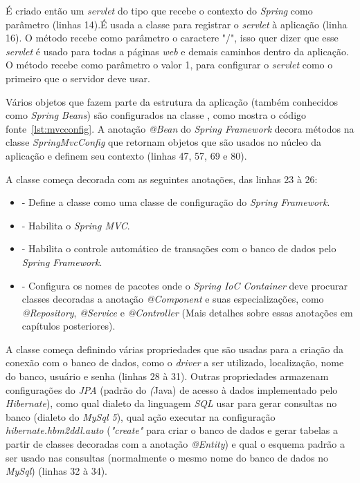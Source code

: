 É criado então um \textit{servlet} do tipo  que recebe o contexto do \textit{Spring} como parâmetro (linhas 14).É usada a classe  para registrar o \textit{servlet} à aplicação (linha 16). O método  recebe como parâmetro o caractere "/", isso quer dizer que esse \textit{servlet} é usado para todas a páginas \textit{web} e demais caminhos dentro da aplicação. O método  recebe como parâmetro o valor 1, para configurar o \textit{servlet} como o primeiro que o servidor deve usar.


Vários objetos que fazem parte da estrutura da aplicação (também conhecidos como \textit{Spring Beans}) são configurados na classe , como mostra o código fonte~\ref{lst:mvcconfig}. A anotação \textit{@Bean} do \textit{Spring Framework} decora métodos na classe \textit{SpringMvcConfig} que retornam objetos que são usados no núcleo da aplicação e definem seu contexto (linhas 47, 57, 69 e 80).

A classe  começa decorada com as seguintes anotações, das linhas 23 à 26:

\begin{itemize}
  \item {} - Define a classe como uma classe de configuração do \textit{Spring Framework}.
  \item {} - Habilita o \textit{Spring MVC}.
  \item {} - Habilita o controle automático de transações com o banco de dados pelo \textit{Spring Framework}.
  \item {} - Configura os nomes de pacotes onde o \textit{Spring IoC Container} deve procurar classes decoradas a anotação \textit{@Component} e suas especializações, como \textit{@Repository}, \textit{@Service} e \textit{@Controller} (Mais detalhes sobre essas anotações em capítulos posteriores).  
\end{itemize}


A classe começa definindo várias propriedades que são usadas para a criação da conexão com o banco de dados, como o \textit{driver} a ser utilizado, localização, nome do banco, usuário e senha (linhas 28 à 31). Outras propriedades armazenam configurações do \textit{JPA} (padrão do \textit(Java) de acesso à dados implementado pelo \textit{Hibernate}), como qual dialeto da linguagem \textit{SQL} usar para gerar consultas no banco (dialeto do \textit{MySql 5}), qual ação executar na configuração \textit{hibernate.hbm2ddl.auto} (\textit{"create"} para criar o banco de dados e gerar tabelas a partir de classes decoradas com a anotação \textit{@Entity}) e qual o esquema padrão a ser usado nas consultas (normalmente o mesmo nome do banco de dados no \textit{MySql}) (linhas 32 à 34).


